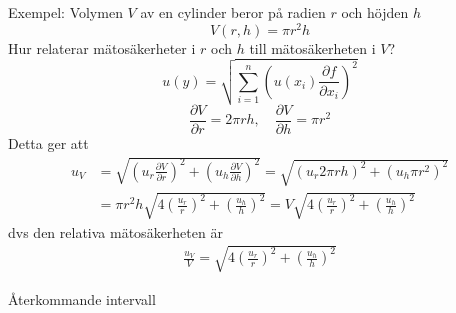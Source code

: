 \documentclass[9pt]{beamer}
\begin{document}
    \begin{frame}
        Exempel: Volymen $V$ av en cylinder beror på radien $r$ och höjden $h$
        \begin{equation*}
            V(r, h) = \pi r^2 h
        \end{equation*}
        Hur relaterar mätosäkerheter i $r$ och $h$ till mätosäkerheten i $V$? 
        \begin{equation*}
            u(y) = \sqrt{\sum_{i=1}^n\left(u(x_i)\frac{\partial f}{\partial x_i}\right)^2}
        \end{equation*}
        \begin{equation*}
             \frac{\partial V}{\partial r} = 2\pi r h, \quad \frac{\partial V}{\partial h} = \pi r^2
        \end{equation*}
        Detta ger att
        \begin{align*}
            u_V &= \sqrt{\left(u_r\frac{\partial V}{\partial r}\right)^2 + \left(u_h\frac{\partial V}{\partial h}\right)^2} =
            \sqrt{(u_r 2\pi r h)^2 + (u_h \pi r^2)^2} \\
            &= \pi r^2 h \sqrt{4\left(\frac{u_r}{r}\right)^2 + \left(\frac{u_h}{h}\right)^2}
            = V \sqrt{4\left(\frac{u_r}{r}\right)^2 + \left(\frac{u_h}{h}\right)^2}
        \end{align*}
        dvs den relativa mätosäkerheten är
        \begin{align*}
            \frac{u_V}{V} = \sqrt{4\left(\frac{u_r}{r}\right)^2 + \left(\frac{u_h}{h}\right)^2}
        \end{align*}

    \end{frame}

    \begin{frame}
        \begin{center}
            \huge{Återkommande intervall}
        \end{center}
    \end{frame}
\end{document}
